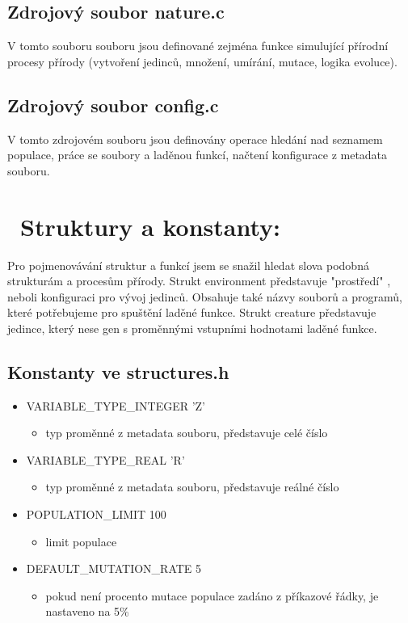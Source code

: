 \documentclass{article}
\begin{document}
\subsection{Zdrojový soubor nature.c}

V tomto souboru souboru jsou definované zejména funkce simulující přírodní procesy přírody (vytvoření jedinců, množení, umírání, mutace, logika evoluce).


\subsection{Zdrojový soubor config.c}

V tomto zdrojovém souboru jsou definovány operace hledání nad seznamem populace, práce se soubory a laděnou funkcí, načtení konfigurace z metadata souboru.


\section{ \ Struktury a konstanty:}

Pro pojmenovávání struktur a funkcí jsem se snažil hledat slova podobná strukturám a procesům přírody. Strukt environment představuje "prostředí" , neboli konfiguraci pro vývoj jedinců. Obsahuje také názvy souborů a programů, které potřebujeme pro spuštění laděné funkce. Strukt creature představuje jedince, který nese gen s proměnnými vstupními hodnotami laděné funkce.
\subsection{Konstanty ve structures.h}
\begin{itemize}
\item VARIABLE\_TYPE\_INTEGER 'Z'
\begin{itemize}
\item typ proměnné z metadata souboru, představuje celé číslo
\end{itemize}
\item VARIABLE\_TYPE\_REAL 'R'
\begin{itemize}
\item typ proměnné z metadata souboru, představuje reálné číslo
\end{itemize}
\item POPULATION\_LIMIT 100
\begin{itemize}
\item limit populace
\end{itemize}
\item DEFAULT\_MUTATION\_RATE 5
\begin{itemize}
\item pokud není procento mutace populace zadáno z příkazové řádky, je nastaveno na 5\%
\end{itemize}
\end{itemize}
\end{document}
